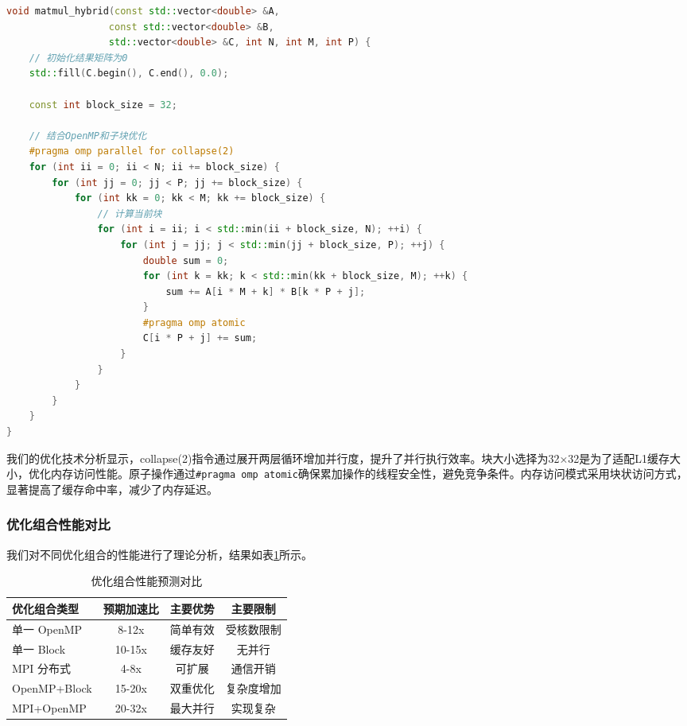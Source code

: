 \documentclass[12pt,a4paper]{article}
\begin{document}
\begin{lstlisting}[language=c++,caption=OpenMP + Block Tiling混合优化]
void matmul_hybrid(const std::vector<double> &A,
                  const std::vector<double> &B,
                  std::vector<double> &C, int N, int M, int P) {
    // 初始化结果矩阵为0
    std::fill(C.begin(), C.end(), 0.0);

    const int block_size = 32;

    // 结合OpenMP和子块优化
    #pragma omp parallel for collapse(2)
    for (int ii = 0; ii < N; ii += block_size) {
        for (int jj = 0; jj < P; jj += block_size) {
            for (int kk = 0; kk < M; kk += block_size) {
                // 计算当前块
                for (int i = ii; i < std::min(ii + block_size, N); ++i) {
                    for (int j = jj; j < std::min(jj + block_size, P); ++j) {
                        double sum = 0;
                        for (int k = kk; k < std::min(kk + block_size, M); ++k) {
                            sum += A[i * M + k] * B[k * P + j];
                        }
                        #pragma omp atomic
                        C[i * P + j] += sum;
                    }
                }
            }
        }
    }
}
\end{lstlisting}

我们的优化技术分析显示，collapse(2)指令通过展开两层循环增加并行度，提升了并行执行效率。块大小选择为32×32是为了适配L1缓存大小，优化内存访问性能。原子操作通过\texttt{\#pragma omp atomic}确保累加操作的线程安全性，避免竞争条件。内存访问模式采用块状访问方式，显著提高了缓存命中率，减少了内存延迟。

\subsubsection{优化组合性能对比}

我们对不同优化组合的性能进行了理论分析，结果如表\ref{tab:optimization_combinations}所示。

\begin{table}[H]
\centering
\caption{优化组合性能预测对比}
\label{tab:optimization_combinations}
\begin{tabular}{lccc}
\toprule
优化组合类型 & 预期加速比 & 主要优势 & 主要限制 \\
\midrule
单一 OpenMP & 8-12x & 简单有效 & 受核数限制 \\
单一 Block & 10-15x & 缓存友好 & 无并行 \\
MPI 分布式 & 4-8x & 可扩展 & 通信开销 \\
OpenMP+Block & 15-20x & 双重优化 & 复杂度增加 \\
MPI+OpenMP & 20-32x & 最大并行 & 实现复杂 \\
\bottomrule
\end{tabular}
\end{table}
\end{document}
